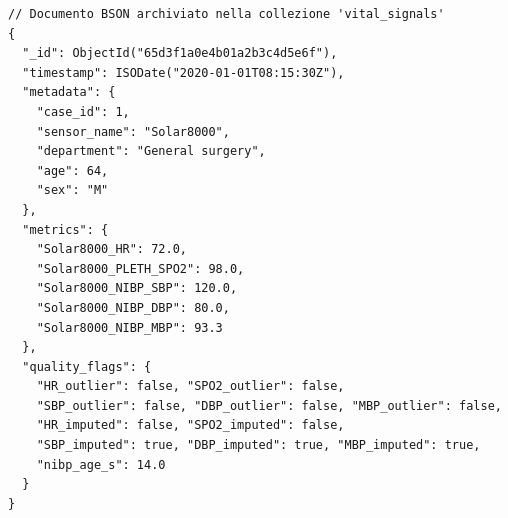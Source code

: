 \vspace{4pt}
\noindent\begin{minipage}{\textwidth}
\begin{lstlisting}
// Documento BSON archiviato nella collezione 'vital_signals'
{
  "_id": ObjectId("65d3f1a0e4b01a2b3c4d5e6f"),
  "timestamp": ISODate("2020-01-01T08:15:30Z"),
  "metadata": {
    "case_id": 1,
    "sensor_name": "Solar8000",
    "department": "General surgery",
    "age": 64,
    "sex": "M"
  },
  "metrics": {
    "Solar8000_HR": 72.0,
    "Solar8000_PLETH_SPO2": 98.0,
    "Solar8000_NIBP_SBP": 120.0,
    "Solar8000_NIBP_DBP": 80.0,
    "Solar8000_NIBP_MBP": 93.3
  },
  "quality_flags": {
    "HR_outlier": false, "SPO2_outlier": false,
    "SBP_outlier": false, "DBP_outlier": false, "MBP_outlier": false,
    "HR_imputed": false, "SPO2_imputed": false,
    "SBP_imputed": true, "DBP_imputed": true, "MBP_imputed": true,
    "nibp_age_s": 14.0
  }
}
\end{lstlisting}
\label{lst:bson_gold}
\end{minipage}
\vspace{8pt}
